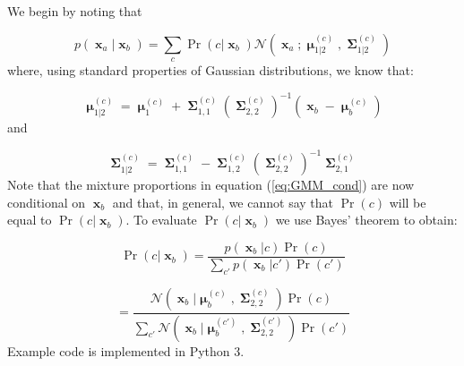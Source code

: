 \documentclass[a4paper, 11pt]{article}
\DeclareMathOperator{\x}{\boldsymbol{x}}
\DeclareMathOperator{\bmu}{\boldsymbol{\mu}}
\DeclareMathOperator{\bSigma}{\boldsymbol{\Sigma}}
\begin{document}
We begin by noting that

\begin{equation}
	p(\x_a| \x_b) = \sum_c \Pr(c| \x_b) \mathcal{N}\left(
		\x_a; \bmu_{1|2}^{(c)}, \bSigma_{1|2}^{(c)}
	\right)
    \label{eq:GMM_cond}
\end{equation}
where, using standard properties of Gaussian distributions, we know that:

\begin{equation}
	\bmu_{1|2}^{(c)} = \bmu_{1}^{(c)} + \bSigma_{1,1}^{(c)} \left(\bSigma^{(c)}_{2,2}\right)^{-1} (\x_b - \bmu_b^{(c)})
\end{equation}
and

\begin{equation}
	\bSigma_{1|2}^{(c)} = \bSigma_{1,1}^{(c)} - \bSigma_{1,2}^{(c)} \left(\bSigma^{(c)}_{2,2}\right)^{-1} \bSigma^{(c)}_{2,1}
\end{equation}
Note that the mixture proportions in equation (\ref{eq:GMM_cond}) are now conditional on $\x_b$ and that, in general, we cannot say that $\Pr(c)$ will be equal to $\Pr(c | \x_b)$. To evaluate $\Pr(c | \x_b)$ we use Bayes' theorem to obtain:

\begin{equation}
    \Pr(c | \x_b) = \frac{p(\x_b | c) \Pr(c)}{\sum_{c'} p(\x_b | c') \Pr(c')}
\end{equation}

\begin{equation}
    = \frac{ \mathcal{N}(\x_b | \bmu_b^{(c)}, \bSigma_{2,2}^{(c)}) \Pr(c)}{\sum_{c'} \mathcal{N}(\x_b | \bmu_b^{(c')}, \bSigma_{2,2}^{(c')}) \Pr(c')}
\end{equation}
Example code is implemented in Python 3. 
\end{document}

